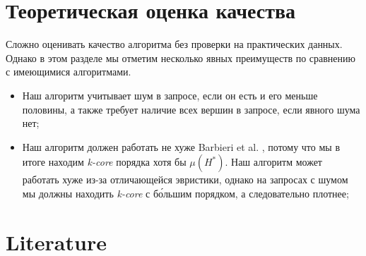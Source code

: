 \documentclass[11pt,a4paper,oneside]{article}
\begin{document}
\section{Теоретическая оценка качества}

Сложно оценивать качество алгоритма без проверки на практических данных. Однако в этом разделе мы отметим несколько явных преимуществ по сравнению с имеющимися алгоритмами.

\begin{itemize}
  \item Наш алгоритм учитывает шум в запросе, если он есть и его меньше половины, а также требует наличие всех вершин в запросе, если явного шума нет;
  \item Наш алгоритм должен работать не хуже Barbieri et al. \cite{Barbieri15}, потому что мы в итоге находим \textit{k-core} порядка хотя бы $\mu(H^*)$. Наш алгоритм может работать хуже из-за отличающейся эвристики, однако на запросах с шумом мы должны находить \textit{k-core} с б\'{о}льшим порядком, а следовательно плотнее;
\end{itemize}


\section{Literature}
\end{document}
